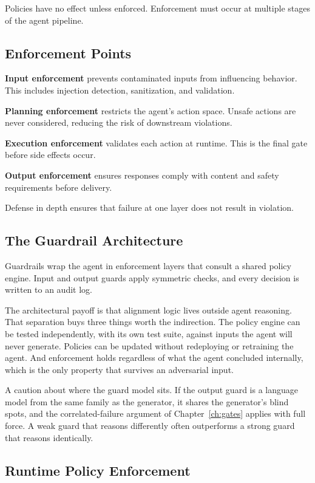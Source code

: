 Policies have no effect unless enforced. Enforcement must occur at multiple stages of the agent pipeline.

\subsection{Enforcement Points}

\textbf{Input enforcement} prevents contaminated inputs from influencing behavior. This includes injection detection, sanitization, and validation.

\textbf{Planning enforcement} restricts the agent’s action space. Unsafe actions are never considered, reducing the risk of downstream violations.

\textbf{Execution enforcement} validates each action at runtime. This is the final gate before side effects occur.

\textbf{Output enforcement} ensures responses comply with content and safety requirements before delivery.

Defense in depth ensures that failure at one layer does not result in violation.

\subsection{The Guardrail Architecture}

Guardrails wrap the agent in enforcement layers that consult a shared policy
engine. Input and output guards apply symmetric checks, and every decision is
written to an audit log.

The architectural payoff is that alignment logic lives outside agent reasoning.
That separation buys three things worth the indirection. The policy engine can be
tested independently, with its own test suite, against inputs the agent will never
generate. Policies can be updated without redeploying or retraining the agent.
And enforcement holds regardless of what the agent concluded internally, which is
the only property that survives an adversarial input.

A caution about where the guard model sits. If the output guard is a language
model from the same family as the generator, it shares the generator's blind spots,
and the correlated-failure argument of Chapter~\ref{ch:gates} applies with full
force. A weak guard that reasons differently often outperforms a strong guard that
reasons identically.

\subsection{Runtime Policy Enforcement}

